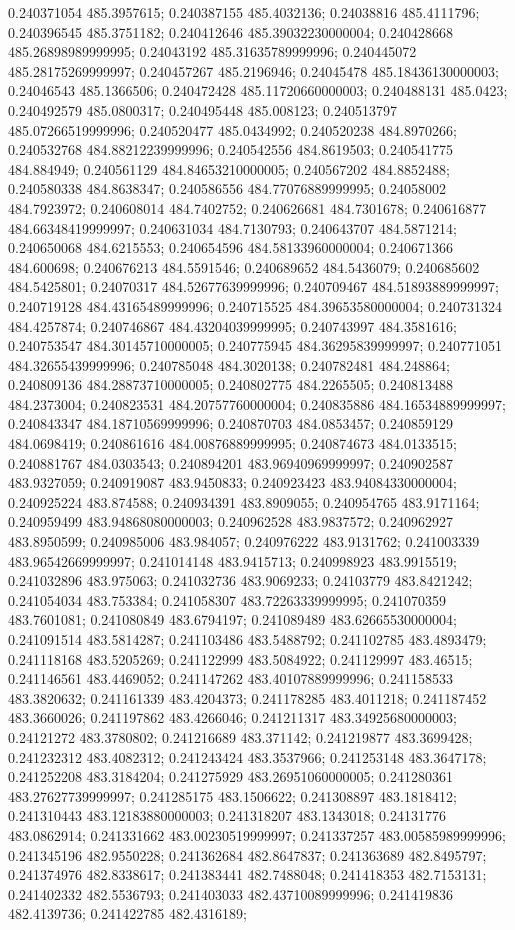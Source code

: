0.240371054 485.3957615; 0.240387155 485.4032136; 0.24038816 485.4111796; 0.240396545 485.3751182; 0.240412646 485.39032230000004; 0.240428668 485.26898989999995; 0.24043192 485.31635789999996; 0.240445072 485.28175269999997; 0.240457267 485.2196946; 0.24045478 485.18436130000003; 0.24046543 485.1366506; 0.240472428 485.11720660000003; 0.240488131 485.0423; 0.240492579 485.0800317; 0.240495448 485.008123; 0.240513797 485.07266519999996; 0.240520477 485.0434992; 0.240520238 484.8970266; 0.240532768 484.88212239999996; 0.240542556 484.8619503; 0.240541775 484.884949; 0.240561129 484.84653210000005; 0.240567202 484.8852488; 0.240580338 484.8638347; 0.240586556 484.77076889999995; 0.24058002 484.7923972; 0.240608014 484.7402752; 0.240626681 484.7301678; 0.240616877 484.66348419999997; 0.240631034 484.7130793; 0.240643707 484.5871214; 0.240650068 484.6215553; 0.240654596 484.58133960000004; 0.240671366 484.600698; 0.240676213 484.5591546; 0.240689652 484.5436079; 0.240685602 484.5425801; 0.24070317 484.52677639999996; 0.240709467 484.51893889999997; 0.240719128 484.43165489999996; 0.240715525 484.39653580000004; 0.240731324 484.4257874; 0.240746867 484.43204039999995; 0.240743997 484.3581616; 0.240753547 484.30145710000005; 0.240775945 484.36295839999997; 0.240771051 484.32655439999996; 0.240785048 484.3020138; 0.240782481 484.248864; 0.240809136 484.28873710000005; 0.240802775 484.2265505; 0.240813488 484.2373004; 0.240823531 484.20757760000004; 0.240835886 484.16534889999997; 0.240843347 484.18710569999996; 0.240870703 484.0853457; 0.240859129 484.0698419; 0.240861616 484.00876889999995; 0.240874673 484.0133515; 0.240881767 484.0303543; 0.240894201 483.96940969999997; 0.240902587 483.9327059; 0.240919087 483.9450833; 0.240923423 483.94084330000004; 0.240925224 483.874588; 0.240934391 483.8909055; 0.240954765 483.9171164; 0.240959499 483.94868080000003; 0.240962528 483.9837572; 0.240962927 483.8950599; 0.240985006 483.984057; 0.240976222 483.9131762; 0.241003339 483.96542669999997; 0.241014148 483.9415713; 0.240998923 483.9915519; 0.241032896 483.975063; 0.241032736 483.9069233; 0.24103779 483.8421242; 0.241054034 483.753384; 0.241058307 483.72263339999995; 0.241070359 483.7601081; 0.241080849 483.6794197; 0.241089489 483.62665530000004; 0.241091514 483.5814287; 0.241103486 483.5488792; 0.241102785 483.4893479; 0.241118168 483.5205269; 0.241122999 483.5084922; 0.241129997 483.46515; 0.241146561 483.4469052; 0.241147262 483.40107889999996; 0.241158533 483.3820632; 0.241161339 483.4204373; 0.241178285 483.4011218; 0.241187452 483.3660026; 0.241197862 483.4266046; 0.241211317 483.34925680000003; 0.24121272 483.3780802; 0.241216689 483.371142; 0.241219877 483.3699428; 0.241232312 483.4082312; 0.241243424 483.3537966; 0.241253148 483.3647178; 0.241252208 483.3184204; 0.241275929 483.26951060000005; 0.241280361 483.27627739999997; 0.241285175 483.1506622; 0.241308897 483.1818412; 0.241310443 483.12183880000003; 0.241318207 483.1343018; 0.24131776 483.0862914; 0.241331662 483.00230519999997; 0.241337257 483.00585989999996; 0.241345196 482.9550228; 0.241362684 482.8647837; 0.241363689 482.8495797; 0.241374976 482.8338617; 0.241383441 482.7488048; 0.241418353 482.7153131; 0.241402332 482.5536793; 0.241403033 482.43710089999996; 0.241419836 482.4139736; 0.241422785 482.4316189; 